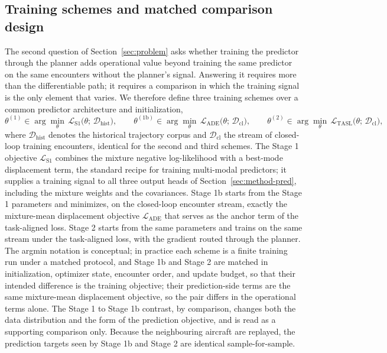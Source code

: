 \documentclass[11pt]{article}
\theoremstyle{plain}
\theoremstyle{definition}
\begin{document}
\subsection{Training schemes and matched comparison design}
\label{sec:method-training}
 
The second question of Section~\ref{sec:problem} asks whether
training the predictor through the planner adds operational value
beyond training the same predictor on the same encounters without the
planner's signal. Answering it requires more than the differentiable
path; it requires a comparison in which the training signal is the
only element that varies. We therefore define three training schemes
over a common predictor architecture and initialization,
\begin{equation}
	\label{eq:training-schemes}
	\theta^{(1)}
	\in \arg\min_{\theta}\,
	\mathcal{L}_{\mathrm{S1}}\big(\theta;\, \mathcal{D}_{\mathrm{hist}}\big),
	\qquad
	\theta^{(1\mathrm{b})}
	\in \arg\min_{\theta}\,
	\mathcal{L}_{\mathrm{ADE}}\big(\theta;\, \mathcal{D}_{\mathrm{cl}}\big),
	\qquad
	\theta^{(2)}
	\in \arg\min_{\theta}\,
	\mathcal{L}_{\mathrm{TASL}}\big(\theta;\, \mathcal{D}_{\mathrm{cl}}\big),
\end{equation}
where $\mathcal{D}_{\mathrm{hist}}$ denotes the historical trajectory
corpus and $\mathcal{D}_{\mathrm{cl}}$ the stream of closed-loop
training encounters, identical for the second and third schemes. The
Stage 1 objective $\mathcal{L}_{\mathrm{S1}}$ combines the mixture
negative log-likelihood with a best-mode displacement term, the
standard recipe for training multi-modal predictors; it supplies a
training signal to all three output heads of
Section~\ref{sec:method-pred}, including the mixture weights and the
covariances. Stage 1b starts from the Stage 1 parameters and
minimizes, on the closed-loop encounter stream, exactly the
mixture-mean displacement objective $\mathcal{L}_{\mathrm{ADE}}$ that
serves as the anchor term of the task-aligned loss.
Stage 2 starts from the same parameters and trains on the same stream
under the task-aligned loss, with the gradient routed through the
planner. The argmin notation is conceptual; in practice each scheme is
a finite training run under a matched protocol, and Stage 1b and Stage
2 are matched in initialization, optimizer state, encounter order,
and update budget, so that their intended difference is the training objective; their prediction-side terms are the same mixture-mean displacement objective, so the pair differs in the operational terms alone. The Stage 1 to Stage 1b contrast, by comparison, changes both the data distribution and the form of the prediction objective, and is read as a supporting comparison only. Because the neighbouring aircraft are
replayed, the prediction targets seen by Stage 1b and Stage 2 are identical sample-for-sample.
 
\end{document}
